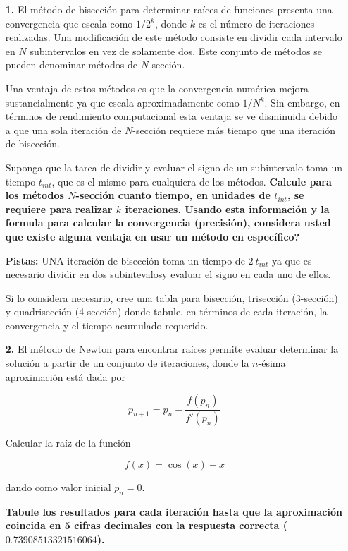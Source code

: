 \documentclass[a4,useAMS,usenatbib,usegraphicx,12pt]{article}
\begin{document}
\begin{itemize}

 \item[\textbf{1.}] 
 El método de bisección para determinar raíces de funciones presenta una
 convergencia que escala como $1/2^k$, donde $k$ es el número de iteraciones 
 realizadas. Una modificación de este método consiste en dividir cada intervalo
 en $N$ subintervalos en vez de solamente dos. Este conjunto de métodos se pueden
 denominar métodos de $N$-sección. 
 
 Una ventaja de estos métodos es que la convergencia numérica mejora 
 sustancialmente ya que escala aproximadamente como $1/N^k$. Sin embargo, en 
 términos de rendimiento computacional esta ventaja se ve disminuida debido a que 
 una sola iteración de $N$-sección requiere más tiempo que una iteración de 
 bisección.
 
 Suponga que la tarea de dividir y evaluar el signo de un subintervalo toma un 
 tiempo $t_{int}$, que es el mismo para cualquiera de los métodos. \textbf{Calcule 
 para los métodos $N$-sección cuanto tiempo, en unidades de $t_{int}$, se requiere 
 para realizar $k$ iteraciones. Usando esta información y la formula para calcular
 la convergencia (precisión), considera usted que existe alguna ventaja en usar
 un método en específico?}
 
 \textbf{Pistas:} UNA iteración de bisección toma un tiempo de $2\ t_{int}$ ya 
 que es necesario dividir en dos subintevalosy evaluar el signo en cada uno de 
 ellos. 
 
 Si lo considera necesario, cree una tabla para bisección, trisección (3-sección) y 
 quadri\-sección (4-sección) donde tabule, en términos de cada iteración, la 
 convergencia y el tiempo acumulado requerido.
 
 
 \item[\textbf{2.}] 
 El método de Newton para encontrar raíces permite evaluar determinar la 
 solución a partir de un conjunto de iteraciones, donde la $n$-ésima aproximación
 está dada por
 
 \[ p_{n+1} = p_n - \frac{f(p_n)}{f'(p_n)} \]
 
 Calcular la raíz de la función
 
 \[f(x) = \cos(x)-x\]
 
 dando como valor inicial $p_n = 0$.
 
 \textbf{Tabule los resultados para cada iteración hasta que la aproximación coincida
 en 5 cifras decimales con la respuesta correcta ($0.73908513321516064$).}
 

\end{itemize}
\end{document}
